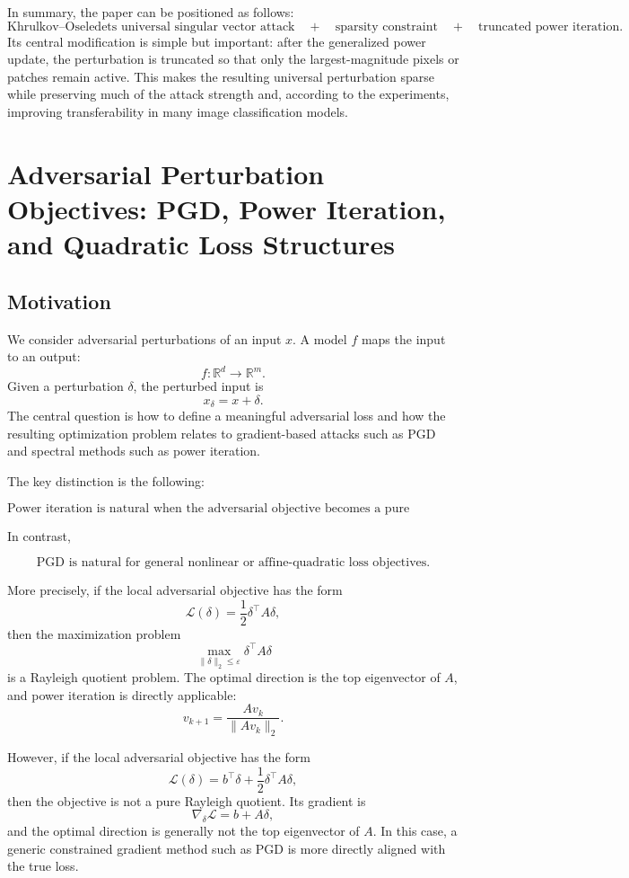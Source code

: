 \documentclass{article}
\begin{document}
In summary, the paper can be positioned as follows:
\[
    \text{Khrulkov--Oseledets universal singular vector attack}
    \quad+\quad
    \text{sparsity constraint}
    \quad+\quad
    \text{truncated power iteration}.
\]
Its central modification is simple but important: after the generalized power update, the perturbation is truncated so that only the largest-magnitude pixels or patches remain active. This makes the resulting universal perturbation sparse while preserving much of the attack strength and, according to the experiments, improving transferability in many image classification models.

\section{Adversarial Perturbation Objectives: PGD, Power Iteration, and Quadratic Loss Structures}

\subsection{Motivation}

We consider adversarial perturbations of an input \(x\). A model \(f\) maps the input to an output:
\[
    f: \mathbb{R}^d \to \mathbb{R}^m.
\]
Given a perturbation \(\delta\), the perturbed input is
\[
    x_\delta = x+\delta.
\]
The central question is how to define a meaningful adversarial loss and how the resulting optimization problem relates to gradient-based attacks such as PGD and spectral methods such as power iteration.

The key distinction is the following:

\[
\boxed{
\text{Power iteration is natural when the adversarial objective becomes a pure quadratic form.}
}
\]

In contrast,

\[
\boxed{
\text{PGD is natural for general nonlinear or affine-quadratic loss objectives.}
}
\]

More precisely, if the local adversarial objective has the form
\[
    \mathcal{L}(\delta)
    =
    \frac{1}{2}\delta^\top A\delta,
\]
then the maximization problem
\[
    \max_{\|\delta\|_2\le \varepsilon}
    \delta^\top A\delta
\]
is a Rayleigh quotient problem. The optimal direction is the top eigenvector of \(A\), and power iteration is directly applicable:
\[
    v_{k+1}
    =
    \frac{A v_k}{\|A v_k\|_2}.
\]

However, if the local adversarial objective has the form
\[
    \mathcal{L}(\delta)
    =
    b^\top \delta
    +
    \frac{1}{2}\delta^\top A\delta,
\]
then the objective is not a pure Rayleigh quotient. Its gradient is
\[
    \nabla_\delta \mathcal{L}
    =
    b+A\delta,
\]
and the optimal direction is generally not the top eigenvector of \(A\). In this case, a generic constrained gradient method such as PGD is more directly aligned with the true loss.
\end{document}

